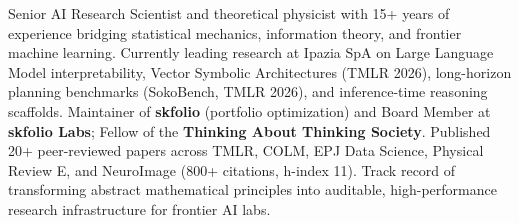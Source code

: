 \documentclass[11pt, a4paper]{awesome-cv}
\begin{document}
\makecvheader


Senior AI Research Scientist and theoretical physicist with 15+ years of experience bridging statistical mechanics, information theory, and frontier machine learning. Currently leading research at Ipazia SpA on Large Language Model interpretability, Vector Symbolic Architectures (TMLR 2026), long-horizon planning benchmarks (SokoBench, TMLR 2026), and inference-time reasoning scaffolds. Maintainer of \textbf{skfolio} (portfolio optimization) and Board Member at \textbf{skfolio Labs}; Fellow of the \textbf{Thinking About Thinking Society}. Published 20+ peer-reviewed papers across TMLR, COLM, EPJ Data Science, Physical Review E, and NeuroImage (800+ citations, h-index 11). Track record of transforming abstract mathematical principles into auditable, high-performance research infrastructure for frontier AI labs.



\end{document}
